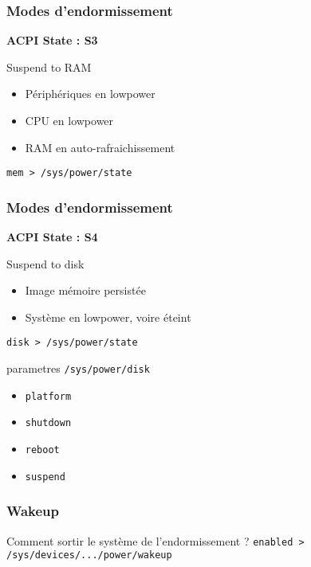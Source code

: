 \begin{frame}
	\frametitle{Modes d'endormissement}
	\textbf{ACPI State : S3}
	\begin{block}{Suspend to RAM}
		\begin{itemize}
			\item Périphériques en lowpower
			\item CPU en lowpower
			\item RAM en auto-rafraichissement
		\end{itemize}
	\end{block}
	\texttt{mem > /sys/power/state}
\end{frame}
\begin{frame}
	\frametitle{Modes d'endormissement}
	\textbf{ACPI State : S4}
	\begin{block}{Suspend to disk}
		\begin{itemize}
			\item Image mémoire persistée
			\item Système en lowpower, voire éteint
		\end{itemize}
	\end{block}
	\texttt{disk > /sys/power/state}
	\begin{block}{parametres}
		\texttt{/sys/power/disk}
		\begin{itemize}
			\item \texttt{platform}
			\item \texttt{shutdown}
			\item \texttt{reboot}
			\item \texttt{suspend}
		\end{itemize}
	\end{block}
\end{frame}

\begin{frame}
	\frametitle{Wakeup}
	Comment sortir le système de l'endormissement ?
	\texttt{enabled > /sys/devices/.../power/wakeup}
\end{frame}



